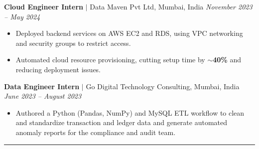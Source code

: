 \documentclass[10pt, letterpaper]{article}
\newcommand{\sectiondivider}{\vspace{0.46em}\hrule\vspace{0.43em}}
\newcommand{\rolegap}{\vspace{5.2pt}}
\begin{document}
\rolegap
\noindent\textbf{Cloud Engineer Intern} $|$ Data Maven Pvt Ltd, Mumbai, India \hfill \textit{November 2023 -- May 2024}
\begin{itemize}\setlength{\itemsep}{0.48pt}
\item Deployed backend services on AWS EC2 and RDS, using VPC networking and security groups to restrict access.
\item Automated cloud resource provisioning, cutting setup time by \textbf{$\sim$40\%} and reducing deployment issues.
\end{itemize}
\rolegap
\noindent\textbf{Data Engineer Intern} $|$ Go Digital Technology Consulting, Mumbai, India \hfill \textit{June 2023 -- August 2023}
\begin{itemize}\setlength{\itemsep}{0.48pt}
\item Authored a Python (Pandas, NumPy) and MySQL ETL workflow to clean and standardize transaction and ledger data and generate automated anomaly reports for the compliance and audit team.
\end{itemize}
\sectiondivider
\end{document}
